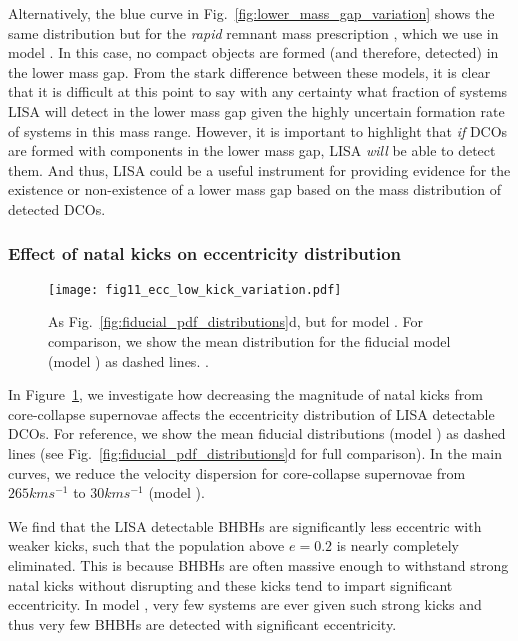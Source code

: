 Alternatively, the blue curve in Fig.~\ref{fig:lower_mass_gap_variation} shows the same distribution but for the \textit{rapid} remnant mass prescription \citep{Fryer+2012}, which we use in model \modRapid{}. In this case, no compact objects are formed (and therefore, detected) in the lower mass gap. From the stark difference between these models, it is clear that it is difficult at this point to say with any certainty what fraction of systems LISA will detect in the lower mass gap given the highly uncertain formation rate of systems in this mass range.
%
However, it is important to highlight that \textit{if} DCOs are formed with components in the lower mass gap, LISA \textit{will} be able to detect them. And thus, LISA could be a useful instrument for providing evidence for the existence or non-existence of a lower mass gap based on the mass distribution of detected DCOs.

\subsubsection{Effect of natal kicks on eccentricity distribution}

\begin{figure}[tb]
    \centering
    \texttt{[image: fig11\_ecc\_low\_kick\_variation.pdf]}
    \caption{As Fig.~\ref{fig:fiducial_pdf_distributions}d, but for model \modSigLower{}. For comparison, we show the mean distribution for the fiducial model (model \modFid{}) as dashed lines. \href{https://github.com/TomWagg/detecting-DCOs-in-LISA/blob/main/paper/figures/fig11_ecc_low_kick_variation.pdf}{\faFileImage} \href{https://github.com/TomWagg/detecting-DCOs-in-LISA/blob/main/paper/figure_notebooks/variations.ipynb}{\faBook}.}
    \label{fig:ecc_low_kick_variation}
\end{figure}

In Figure~\ref{fig:ecc_low_kick_variation}, we investigate how decreasing the magnitude of natal kicks from core-collapse supernovae affects the eccentricity distribution of LISA detectable DCOs. For reference, we show the mean fiducial distributions (model \modFid{}) as dashed lines (see Fig.~\ref{fig:fiducial_pdf_distributions}d for full comparison). In the main curves, we reduce the velocity dispersion for core-collapse supernovae from $265 \unit{km}{s^{-1}}$ to $30 \unit{km}{s^{-1}}$ (model \modSigLower{}).

We find that the LISA detectable BHBHs are significantly less eccentric with weaker kicks, such that the population above $e = 0.2$ is nearly completely eliminated. This is because BHBHs are often massive enough to withstand strong natal kicks without disrupting and these kicks tend to impart significant eccentricity. In model \modSigLower{}, very few systems are ever given such strong kicks and thus very few BHBHs are detected with significant eccentricity.

